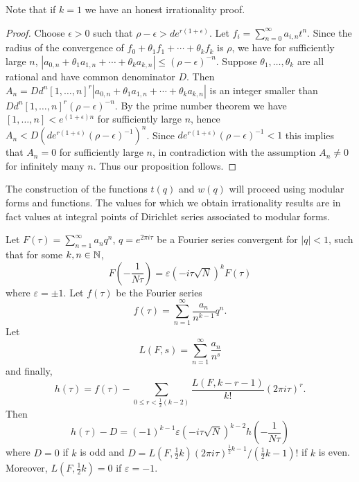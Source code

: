 \begin{remark*}
    Note that if $k = 1$ we have an honest irrationality proof.
\end{remark*}

\begin{proof}
    Choose $\epsilon > 0$ such that $\rho - \epsilon > d e^{r(1 + \epsilon)}$.
    Let $f_i = \sum_{n=0}^{\infty} a_{i,n} t^n$.
    Since the radius of the convergence of $f_0 + \theta_1 f_1 + \cdots + \theta_k f_k$ is $\rho$,
    we have for sufficiently large $n$, $|a_{0,n} + \theta_1 a_{1,n} + \cdots + \theta_k a_{k,n}| \le (\rho - \epsilon)^{-n}$.
    Suppose $\theta_1, \dots, \theta_k$ are all rational and have common denominator $D$.
    Then $A_n = D d^n [1, \dots, n]^r |a_{0,n} + \theta_1 a_{1,n} + \cdots + \theta_k a_{k,n}|$ is an integer smaller than
    $D d^n [1, \dots, n]^r (\rho - \epsilon)^{-n}$.
    By the prime number theorem we have $[1, \dots, n] < e^{(1 + \epsilon)n}$ for sufficiently large $n$,
    hence $A_n < D (d e^{r(1 + \epsilon)} (\rho - \epsilon)^{-1})^{n}$.
    Since $d e^{r(1 + \epsilon)}  (\rho - \epsilon)^{-1} < 1$ this implies that $A_n = 0$ for sufficiently large $n$,
    in contradiction with the assumption $A_n \ne 0$ for infinitely many $n$.
    Thus our proposition follows. 
\end{proof}

The construction of the functions $t(q)$ and $w(q)$ will proceed using
modular forms and functions. The values for which we obtain irrationality
results are in fact values at integral points of Dirichlet series
associated to modular forms.

\begin{proposition}
    \label{prop:1.2}
    Let $F(\tau) = \sum_{n=1}^{\infty} a_n q^n$, $q = e^{2 \pi i \tau}$ be a Fourier series
    convergent for $|q| < 1$, such that for some $k, n \in \mathbb{N}$,
    $$
        F\left(-\frac{1}{N\tau}\right) = \varepsilon(-i\tau \sqrt{N})^{k} F(\tau)
    $$
    where $\varepsilon = \pm 1$.
    Let $f(\tau)$ be the Fourier series
    $$
        f(\tau) = \sum_{n = 1}^{\infty} \frac{a_n}{n^{k-1}} q^n.
    $$
    Let
    $$
        L(F, s) = \sum_{n=1}^{\infty} \frac{a_n}{n^s}
    $$
    and finally,
    $$
        h(\tau) = f(\tau) - \sum_{0 \le r < \frac{1}{2}(k - 2)} \frac{L(F, k - r - 1)}{k!} (2 \pi i \tau)^r.
    $$
    Then
    $$
        h(\tau) - D = (-1)^{k-1} \varepsilon (-i\tau \sqrt{N})^{k-2} h\left(-\frac{1}{N\tau}\right)
    $$
    where $D = 0$ if $k$ is odd and $D = L(F, \frac{1}{2}k) (2 \pi i \tau)^{\frac{1}{2}k - 1} / (\frac{1}{2}k - 1)!$ if $k$ is even.
    Moreover, $L(F, \frac{1}{2}k) = 0$ if $\varepsilon = -1$.
\end{proposition}

